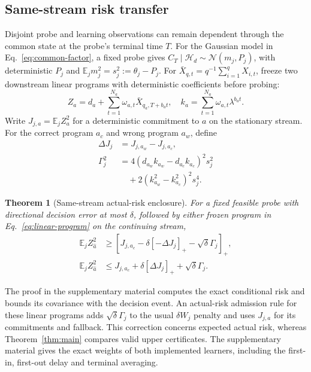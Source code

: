 \documentclass[journal]{IEEEtran}
\newtheorem{theorem}{Theorem}
\newcommand{\E}{\mathbb{E}}
\begin{document}
\subsection{Same-stream risk transfer}
Disjoint probe and learning observations can remain dependent through the common state at the probe's terminal time $T$.
For the Gaussian model in Eq.~\eqref{eq:common-factor}, a fixed probe gives $C_T\mid\mathcal H_d\sim\mathcal N(m_j,P_j)$, with deterministic $P_j$ and $\E_jm_j^2=s_j^2:=\theta_j-P_j$.
For $\bar X_{q,t}=q^{-1}\sum_{i=1}^qX_{i,t}$, freeze two downstream linear programs with deterministic coefficients before probing:
\begin{equation}
Z_a=d_a+\sum_{t=1}^{N_a}\omega_{a,t}\bar X_{q_a,T+b_at},
\quad
k_a=\sum_{t=1}^{N_a}\omega_{a,t}\lambda^{b_at}.
\label{eq:linear-program}
\end{equation}
Write $J_{j,a}=\E_jZ_a^2$ for a deterministic commitment to $a$ on the stationary stream.
For the correct program $a_c$ and wrong program $a_w$, define
\begin{align}
\Delta J_j&=J_{j,a_w}-J_{j,a_c},\nonumber\\
\Gamma_j^2&=4(d_{a_w}k_{a_w}-d_{a_c}k_{a_c})^2s_j^2\nonumber\\
&\quad+2(k_{a_w}^2-k_{a_c}^2)^2s_j^4.
\label{eq:selection-carryover}
\end{align}
\begin{theorem}[Same-stream actual-risk enclosure]
For a fixed feasible probe with directional decision error at most $\delta$, followed by either frozen program in Eq.~\eqref{eq:linear-program} on the continuing stream,
\begin{align}
\E_jZ_{\widehat a}^2
&\ge\left[J_{j,a_c}-\delta[-\Delta J_j]_+-\sqrt\delta\Gamma_j\right]_+,\nonumber\\
\E_jZ_{\widehat a}^2
&\le J_{j,a_c}+\delta[\Delta J_j]_++\sqrt\delta\Gamma_j.
\label{eq:same-stream-risk}
\end{align}
\label{thm:same-stream}
\end{theorem}
The proof in the supplementary material computes the exact conditional risk and bounds its covariance with the decision event.
An actual-risk admission rule for these linear programs adds $\sqrt\delta\Gamma_j$ to the usual $\delta W_j$ penalty and uses $J_{j,a}$ for its commitments and fallback.
This correction concerns expected actual risk, whereas Theorem~\ref{thm:main} compares valid upper certificates.
The supplementary material gives the exact weights of both implemented learners, including the first-in, first-out delay and terminal averaging.
\end{document}
